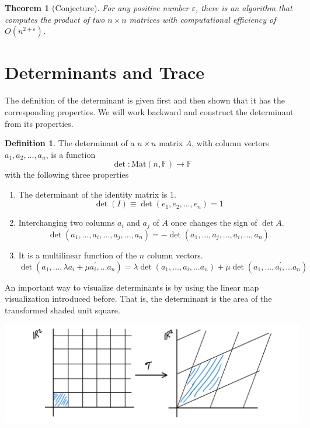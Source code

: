 \documentclass{article}
\newtheorem{theorem}{Theorem}[section]
\theoremstyle{remark}
\theoremstyle{definition}
\newtheorem{definition}{Definition}[section]
\begin{document}
\begin{theorem}[Conjecture]
For any positive number $\varepsilon$, there is an algorithm that computes the product of two $n \times n$ matrices with computational efficiency of $O(n^{2 + \varepsilon})$. 
\end{theorem}

\section{Determinants and Trace}
The definition of the determinant is given first and then shown that it has the corresponding properties. We will work backward and construct the determinant from its properties. 

\begin{definition}
The determinant of a $n \times n$ matrix $A$, with column vectors $a_1, a_2, ..., a_n$, is a function
\[\det: \text{Mat}(n, \mathbb{F}) \longrightarrow \mathbb{F}\]
with the following three properties
\begin{enumerate}
    \item The determinant of the identity matrix is 1. 
\[\det{(I)} \equiv \det{(e_1, e_2, ..., e_n)} = 1\]
    \item Interchanging two columns $a_i$ and $a_j$ of $A$ once changes the sign of $\det{A}$. 
\[\det{(a_1, ..., a_i, ..., a_j, ..., a_n)} = -\det{(a_1, ..., a_j, ..., a_i, ..., a_n)}\]
    \item It is a multilinear function of the $n$ column vectors. 
\[\det{(a_1, ..., \lambda a_i + \mu a_i^\prime, ... a_n)} = \lambda \det{(a_1, ..., a_i, ... a_n)} + \mu \det{(a_1, ..., a_i^\prime, ... a_n)} \]
\end{enumerate}
\end{definition}

An important way to visualize determinants is by using the linear map visualization introduced before. That is, the determinant is the area of the transformed shaded unit square. 
\begin{center}
    \includegraphics[scale=0.25]{img/Determinant.PNG}
\end{center}
\end{document}
